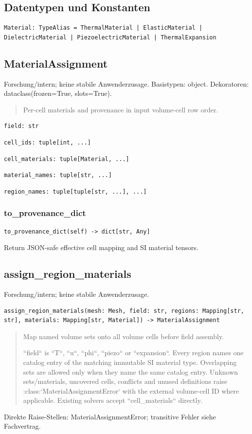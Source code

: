 \subsection*{Datentypen und Konstanten}
\begin{lstlisting}
Material: TypeAlias = ThermalMaterial | ElasticMaterial | DielectricMaterial | PiezoelectricMaterial | ThermalExpansion
\end{lstlisting}
\subsection{MaterialAssignment}
Forschung/intern; keine stabile Anwenderzusage.
Basistypen: object. Dekoratoren: dataclass(frozen=True, slots=True).
\begin{quote}
Per-cell materials and provenance in input volume-cell row order.
\end{quote}
\begin{lstlisting}
field: str
\end{lstlisting}
\begin{lstlisting}
cell_ids: tuple[int, ...]
\end{lstlisting}
\begin{lstlisting}
cell_materials: tuple[Material, ...]
\end{lstlisting}
\begin{lstlisting}
material_names: tuple[str, ...]
\end{lstlisting}
\begin{lstlisting}
region_names: tuple[tuple[str, ...], ...]
\end{lstlisting}
\subsubsection*{to\_provenance\_dict}
\begin{lstlisting}
to_provenance_dict(self) -> dict[str, Any]
\end{lstlisting}
Return JSON-safe effective cell mapping and SI material tensors.
\subsection{assign\_region\_materials}
Forschung/intern; keine stabile Anwenderzusage.
\begin{lstlisting}
assign_region_materials(mesh: Mesh, field: str, regions: Mapping[str, str], materials: Mapping[str, Material]) -> MaterialAssignment
\end{lstlisting}
\begin{quote}
Map named volume sets onto all volume cells before field assembly.\par ``field`` is ``T``, ``u``, ``phi``, ``piezo`` or ``expansion``. Every region names one catalog entry of the matching immutable SI material type. Overlapping sets are allowed only when they name the same catalog entry. Unknown sets/materials, uncovered cells, conflicts and unused definitions raise :class:`MaterialAssignmentError` with the external volume-cell ID where applicable. Existing solvers accept ``cell\_materials`` directly.
\end{quote}
Direkte Raise-Stellen: MaterialAssignmentError; transitive Fehler siehe Fachvertrag.
